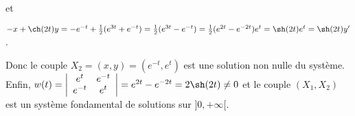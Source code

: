 {\begin{enumerate}
{et

\begin{center}
$-x+\ch(2t)y=-e^{-t}+ \frac{1}{2}(e^{3t}+e^{-t})= \frac{1}{2}(e^{3t}-e^{-t})= \frac{1}{2}(e^{2t}-e^{-2t})e^{t}=\sh(2t)e^{t}=\sh(2t)y'$.
\end{center}

Donc le couple $X_2=(x,y)=(e^{-t},e^{t})$ est une solution non nulle du système. Enfin, $w(t)=\left|
\begin{array}{cc}
e^t&e^{-t}\\
e^{-t}&e^t
\end{array}
\right|=e^{2t}-e^{-2t}=2\sh(2t)\neq0$ et le couple $(X_1,X_2)$ est un système fondamental de solutions sur $]0,+\infty[$.

\begin{center}
\shadowbox{
$\mathcal{S}_{]0,+\infty[}=\left\{
t\mapsto\left(
\begin{array}{c}
\lambda e^t+\mu e^{-t}\\
\lambda e^{-t}+\mu e^t
\end{array}
\right),\;(\lambda,\mu)\in\Rr^2\right\}$.
}
\end{center}}
\end{enumerate}
}